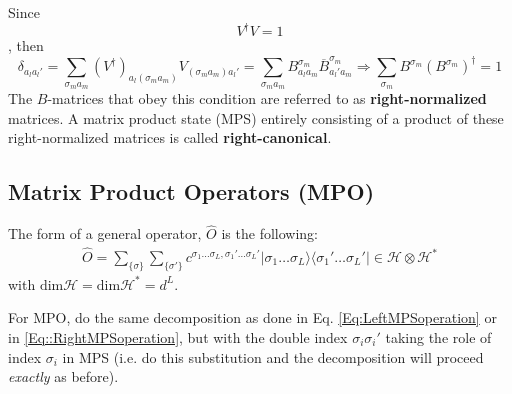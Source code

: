 \documentclass[10pt]{amsart}
\begin{document}
\begin{multicols*}{2}

Since 
\begin{equation}
V^{\dag} V =1
\end{equation},
then
\begin{equation}
	\delta_{a_l a_l'} = \sum_{\sigma_m a_m } (V^{\dag})_{a_l (\sigma_ma_m) } V_{(\sigma_m a_m) a_l'} = \sum_{\sigma_m a_m } B_{a_l a_m}^{\sigma_m} \overline{B}^{\sigma_m}_{a_l' a_m} \Longrightarrow \sum_{\sigma_m} \boxed{ B^{\sigma_m} (B^{\sigma_m})^{\dag} = 1 }
\end{equation}
The $B$-matrices that obey this condition are referred to as \textbf{right-normalized} matrices.  A matrix product state (MPS) entirely consisting of a product of these right-normalized matrices is called \textbf{right-canonical}.  

\subsection{Matrix Product Operators (MPO)}

The form of a general operator, $\widehat{O}$ is the following:
\begin{equation}
\begin{gathered}
\widehat{O} = \sum_{ \lbrace \sigma \rbrace } \sum_{ \lbrace \sigma' \rbrace } c^{\sigma_1 \dots \sigma_L, \sigma_1' \dots \sigma_L'} | \sigma_1 \dots \sigma_L \rangle \langle \sigma_1' \dots \sigma_L' | \in \mathcal{H} \otimes \mathcal{H}^* 
\end{gathered}
\end{equation}
with $\text{dim}\mathcal{H} = \text{dim}\mathcal{H}^* = d^L$. 

For MPO, do the same decomposition as done in Eq. \ref{Eq:LeftMPSoperation} or in \ref{Eq::RightMPSoperation}, but with the double index $\sigma_i \sigma_i'$ taking the role of index $\sigma_i$ in MPS (i.e. do this substitution and the decomposition will proceed \emph{exactly} as before).

\end{multicols*}
\end{document}
